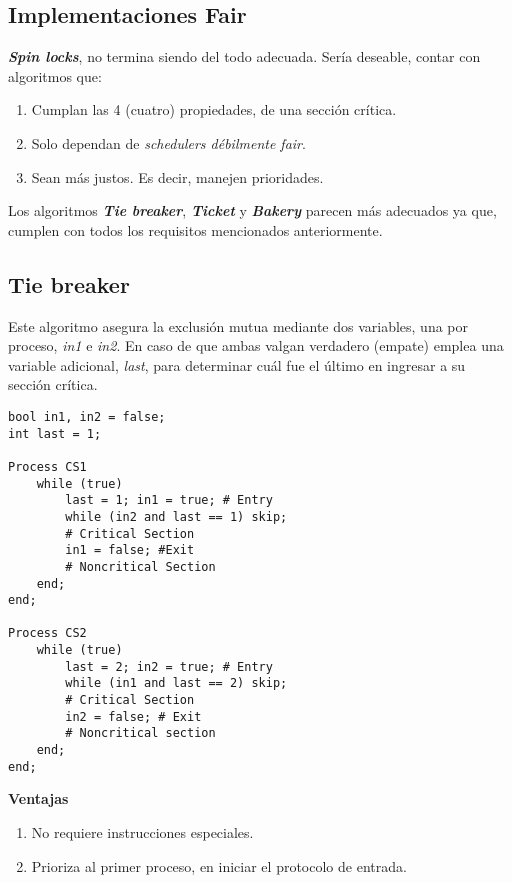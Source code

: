 \documentclass[a4paper, 10pt, margin=0in]{report}
\begin{document}
\subsection{Implementaciones Fair}
\textbf{\emph{Spin locks}}, no termina siendo del todo adecuada. Sería deseable, contar con algoritmos que:
\begin{enumerate}
    \item Cumplan las 4 (cuatro) propiedades, de una sección crítica.
    \item Solo dependan de \emph{schedulers débilmente fair}.
    \item Sean más justos. Es decir, manejen prioridades.
\end{enumerate}

Los algoritmos \textbf{\emph{Tie breaker}}, \textbf{\emph{Ticket}} y \textbf{\emph{Bakery}} parecen más adecuados ya que, cumplen con todos los requisitos mencionados anteriormente.

\subsection{Tie breaker}

Este algoritmo asegura la exclusión mutua mediante dos variables, una por proceso, \emph{in1} e \emph{in2}. En caso de que ambas valgan verdadero (empate) emplea una variable adicional, \emph{last}, para determinar cuál fue el último en ingresar a su sección crítica.

\begin{lstlisting}[multicols=2]
bool in1, in2 = false;
int last = 1;
    
Process CS1
    while (true)
        last = 1; in1 = true; # Entry
        while (in2 and last == 1) skip;
        # Critical Section
        in1 = false; #Exit
        # Noncritical Section
    end;
end;
    
Process CS2
    while (true)
        last = 2; in2 = true; # Entry
        while (in1 and last == 2) skip;
        # Critical Section
        in2 = false; # Exit
        # Noncritical section
    end;
end;
\end{lstlisting}

\textbf{Ventajas}
\begin{enumerate}
    \item No requiere instrucciones especiales.
    \item Prioriza al primer proceso, en iniciar el protocolo de entrada.
\end{enumerate}
\end{document}
